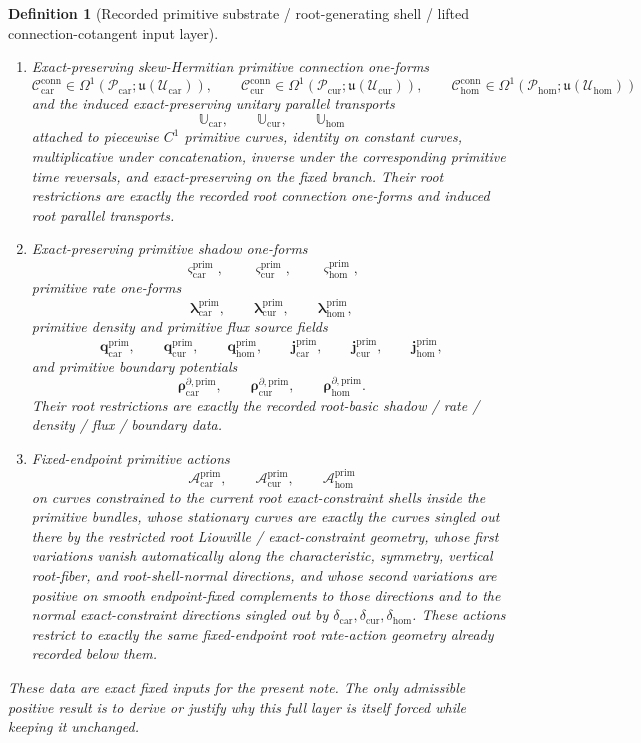 \documentclass[11pt]{article}
\newcommand{\RootTensorClass}{\mathscr U_{\mathrm{car}}}
\newcommand{\RootRelabelClass}{\mathscr U_{\mathrm{cur}}}
\newcommand{\RootFreeClass}{\mathscr U_{\mathrm{hom}}}
\newcommand{\TensorConstraintGap}{\delta_{\mathrm{car}}}
\newcommand{\CurConstraintGap}{\delta_{\mathrm{cur}}}
\newcommand{\HomConstraintGap}{\delta_{\mathrm{hom}}}
\newcommand{\TensorPrimitiveSpace}{\mathcal P_{\mathrm{car}}}
\newcommand{\CurPrimitiveSpace}{\mathcal P_{\mathrm{cur}}}
\newcommand{\HomPrimitiveSpace}{\mathcal P_{\mathrm{hom}}}
\newcommand{\TensorPrimitiveTwo}{\boldsymbol{\Xi}_{\mathrm{car}}^{\mathrm{prim}}}
\newcommand{\CurPrimitiveTwo}{\boldsymbol{\Xi}_{\mathrm{cur}}^{\mathrm{prim}}}
\newcommand{\HomPrimitiveTwo}{\boldsymbol{\Xi}_{\mathrm{hom}}^{\mathrm{prim}}}
\newcommand{\TensorPrimitiveConnectionForm}{\mathcal C_{\mathrm{car}}^{\mathrm{conn}}}
\newcommand{\CurPrimitiveConnectionForm}{\mathcal C_{\mathrm{cur}}^{\mathrm{conn}}}
\newcommand{\HomPrimitiveConnectionForm}{\mathcal C_{\mathrm{hom}}^{\mathrm{conn}}}
\newcommand{\TensorPrimitiveTransport}{\mathbb U_{\mathrm{car}}}
\newcommand{\CurPrimitiveTransport}{\mathbb U_{\mathrm{cur}}}
\newcommand{\HomPrimitiveTransport}{\mathbb U_{\mathrm{hom}}}
\newcommand{\TensorPrimitiveShadowForm}{\boldsymbol{\varsigma}_{\mathrm{car}}^{\mathrm{prim}}}
\newcommand{\CurPrimitiveShadowForm}{\boldsymbol{\varsigma}_{\mathrm{cur}}^{\mathrm{prim}}}
\newcommand{\HomPrimitiveShadowForm}{\boldsymbol{\varsigma}_{\mathrm{hom}}^{\mathrm{prim}}}
\newcommand{\TensorPrimitiveRateForm}{\boldsymbol{\lambda}_{\mathrm{car}}^{\mathrm{prim}}}
\newcommand{\CurPrimitiveRateForm}{\boldsymbol{\lambda}_{\mathrm{cur}}^{\mathrm{prim}}}
\newcommand{\HomPrimitiveRateForm}{\boldsymbol{\lambda}_{\mathrm{hom}}^{\mathrm{prim}}}
\newcommand{\TensorPrimitiveDensitySource}{\boldsymbol{q}_{\mathrm{car}}^{\mathrm{prim}}}
\newcommand{\CurPrimitiveDensitySource}{\boldsymbol{q}_{\mathrm{cur}}^{\mathrm{prim}}}
\newcommand{\HomPrimitiveDensitySource}{\boldsymbol{q}_{\mathrm{hom}}^{\mathrm{prim}}}
\newcommand{\TensorPrimitiveFluxSource}{\boldsymbol{j}_{\mathrm{car}}^{\mathrm{prim}}}
\newcommand{\CurPrimitiveFluxSource}{\boldsymbol{j}_{\mathrm{cur}}^{\mathrm{prim}}}
\newcommand{\HomPrimitiveFluxSource}{\boldsymbol{j}_{\mathrm{hom}}^{\mathrm{prim}}}
\newcommand{\TensorPrimitiveBoundarySource}{\boldsymbol{\rho}_{\mathrm{car}}^{\partial,\mathrm{prim}}}
\newcommand{\CurPrimitiveBoundarySource}{\boldsymbol{\rho}_{\mathrm{cur}}^{\partial,\mathrm{prim}}}
\newcommand{\HomPrimitiveBoundarySource}{\boldsymbol{\rho}_{\mathrm{hom}}^{\partial,\mathrm{prim}}}
\newcommand{\TensorPrimitiveAction}{\mathscr A_{\mathrm{car}}^{\mathrm{prim}}}
\newcommand{\CurPrimitiveAction}{\mathscr A_{\mathrm{cur}}^{\mathrm{prim}}}
\newcommand{\HomPrimitiveAction}{\mathscr A_{\mathrm{hom}}^{\mathrm{prim}}}
\newcommand{\LieU}{\mathfrak u}
\newtheorem{definition}{Definition}
\begin{document}
\begin{definition}[Recorded primitive substrate / root-generating shell / lifted connection-cotangent input layer]
\begin{enumerate}
    \[
    \TensorPrimitiveTwo,\qquad
    \CurPrimitiveTwo,\qquad
    \HomPrimitiveTwo.
    \]
    Their root restrictions are exactly the recorded root Liouville one-forms and root closed two-form geometry.
    \item Exact-preserving skew-Hermitian primitive connection one-forms
    \[
    \TensorPrimitiveConnectionForm\in\Omega^1(\TensorPrimitiveSpace;\LieU(\RootTensorClass)),\qquad
    \CurPrimitiveConnectionForm\in\Omega^1(\CurPrimitiveSpace;\LieU(\RootRelabelClass)),\qquad
    \HomPrimitiveConnectionForm\in\Omega^1(\HomPrimitiveSpace;\LieU(\RootFreeClass))
    \]
    and the induced exact-preserving unitary parallel transports
    \[
    \TensorPrimitiveTransport,\qquad
    \CurPrimitiveTransport,\qquad
    \HomPrimitiveTransport
    \]
    attached to piecewise \(C^1\) primitive curves, identity on constant curves, multiplicative under concatenation, inverse under the corresponding primitive time reversals, and exact-preserving on the fixed branch. Their root restrictions are exactly the recorded root connection one-forms and induced root parallel transports.
    \item Exact-preserving primitive shadow one-forms
    \[
    \TensorPrimitiveShadowForm,\qquad
    \CurPrimitiveShadowForm,\qquad
    \HomPrimitiveShadowForm,
    \]
    primitive rate one-forms
    \[
    \TensorPrimitiveRateForm,\qquad
    \CurPrimitiveRateForm,\qquad
    \HomPrimitiveRateForm,
    \]
    primitive density and primitive flux source fields
    \[
    \TensorPrimitiveDensitySource,\qquad
    \CurPrimitiveDensitySource,\qquad
    \HomPrimitiveDensitySource,\qquad
    \TensorPrimitiveFluxSource,\qquad
    \CurPrimitiveFluxSource,\qquad
    \HomPrimitiveFluxSource,
    \]
    and primitive boundary potentials
    \[
    \TensorPrimitiveBoundarySource,\qquad
    \CurPrimitiveBoundarySource,\qquad
    \HomPrimitiveBoundarySource.
    \]
    Their root restrictions are exactly the recorded root-basic shadow / rate / density / flux / boundary data.
    \item Fixed-endpoint primitive actions
    \[
    \TensorPrimitiveAction,\qquad
    \CurPrimitiveAction,\qquad
    \HomPrimitiveAction
    \]
    on curves constrained to the current root exact-constraint shells inside the primitive bundles, whose stationary curves are exactly the curves singled out there by the restricted root Liouville / exact-constraint geometry, whose first variations vanish automatically along the characteristic, symmetry, vertical root-fiber, and root-shell-normal directions, and whose second variations are positive on smooth endpoint-fixed complements to those directions and to the normal exact-constraint directions singled out by \(\TensorConstraintGap,\CurConstraintGap,\HomConstraintGap\). These actions restrict to exactly the same fixed-endpoint root rate-action geometry already recorded below them.
\end{enumerate}
These data are exact fixed inputs for the present note. The only admissible positive result is to derive or justify why this full layer is itself forced while keeping it unchanged.
\end{definition}
\end{document}
